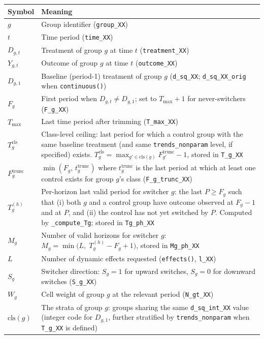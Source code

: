 \documentclass[11pt]{article}
\begin{document}
\begin{center}
\renewcommand{\arraystretch}{1.3}
\begin{tabular}{@{}lp{10cm}@{}}
\toprule
Symbol & Meaning \\
\midrule
$g$ & Group identifier (\texttt{group\_XX}) \\
$t$ & Time period (\texttt{time\_XX}) \\
$D_{g,t}$ & Treatment of group $g$ at time $t$ (\texttt{treatment\_XX}) \\
$Y_{g,t}$ & Outcome of group $g$ at time $t$ (\texttt{outcome\_XX}) \\
$D_{g,1}$ & Baseline (period-1) treatment of group $g$ (\texttt{d\_sq\_XX};
             \texttt{d\_sq\_XX\_orig} when \texttt{continuous()}) \\
$F_g$ & First period when $D_{g,t} \neq D_{g,1}$; set to $T_{\max}+1$ for
        never-switchers (\texttt{F\_g\_XX}) \\
$T_{\max}$ & Last time period after trimming (\texttt{T\_max\_XX}) \\
$T_g^{\text{cls}}$ & Class-level ceiling: last period for which a control group
                     with the same baseline treatment (and same
                     \texttt{trends\_nonparam} level, if specified) exists.
                     $T_g^{\text{cls}} = \max_{g' \in \text{cls}(g)} F_{g'}^{\text{trunc}} - 1$,
                     stored in \texttt{T\_g\_XX} \\
$F_g^{\text{trunc}}$ & $\min(F_g,\, t_g^{\text{trunc}})$ where $t_g^{\text{trunc}}$ is
                        the last period at which at least one control exists for
                        group $g$'s class (\texttt{F\_g\_trunc\_XX}) \\
$T_g^{(h)}$ & Per-horizon last valid period for switcher $g$: the last $P \geq F_g$
              such that (i) both $g$ and a control group have outcome observed
              at $F_g-1$ and at $P$, and (ii) the control has not yet switched
              by $P$. Computed by \texttt{\_compute\_Tg}; stored in
              \texttt{Tg\_ph\_XX} \\
$M_g$ & Number of valid horizons for switcher $g$:
        $M_g = \min\!\bigl(L,\; T_g^{(h)} - F_g + 1\bigr)$,
        stored in \texttt{Mg\_ph\_XX} \\
$L$ & Number of dynamic effects requested (\texttt{effects()}, \texttt{l\_XX}) \\
$S_g$ & Switcher direction: $S_g = 1$ for upward switches, $S_g = 0$ for
        downward switches (\texttt{S\_g\_XX}) \\
$W_g$ & Cell weight of group $g$ at the relevant period (\texttt{N\_gt\_XX}) \\
$\text{cls}(g)$ & The strata of group $g$: groups sharing the same
                 \texttt{d\_sq\_int\_XX} value (integer code for $D_{g,1}$,
                 further stratified by \texttt{trends\_nonparam} when
                 \texttt{T\_g\_XX} is defined) \\
\bottomrule
\end{tabular}
\end{center}
\end{document}
